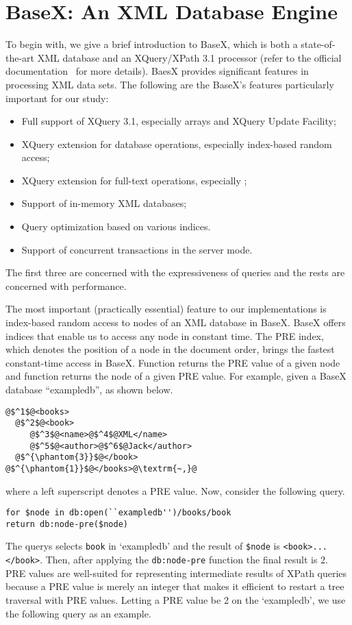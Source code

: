 \section{BaseX: An XML Database Engine}
\label{sect:basex}

To begin with, we give a brief introduction to BaseX, which is both a
state-of-the-art XML database and an XQuery/XPath 3.1 processor (refer to the
official documentation~\cite{basex864} for more details). BaesX provides
significant features in processing XML data sets. The following are the BaseX's
features particularly important for our study:

\begin{itemize}
	\item Full support of XQuery 3.1, especially arrays and XQuery Update Facility;
	\item XQuery extension for database operations, especially index-based
	random access;
	\item XQuery extension for full-text operations, especially
	;
	\item Support of in-memory XML databases;
	\item Query optimization based on various indices.
	\item Support of concurrent transactions in the server mode.
\end{itemize}

The first three are concerned with the expressiveness of queries and the rests
are concerned with performance.

The most important (practically essential) feature to our implementations is
index-based random access to nodes of an XML database in BaseX. BaseX offers
indices that enable us to access any node in constant time. The PRE index, which
denotes the position of a node in the document order, brings the fastest
constant-time access in BaseX. Function  returns the PRE value
of a given node and function  returns the node of a given PRE
value. For example, given a BaseX database ``exampledb'', as shown below.
\begin{lstlisting}[escapechar=\@]
@$^1$@<books>
  @$^2$@<book>
	 @$^3$@<name>@$^4$@XML</name>
	 @$^5$@<author>@$^6$@Jack</author>
  @$^{\phantom{3}}$@</book>
@$^{\phantom{1}}$@</books>@\textrm{~,}@
\end{lstlisting}
where a left superscript denotes a PRE value. Now, consider the following query.
\begin{lstlisting}
for $node in db:open(``exampledb'')/books/book
return db:node-pre($node)
\end{lstlisting}
The querys selects \texttt{book} in `exampledb' and the result of \texttt{\$node} is
\verb|<book>...</book>|. Then, after applying the \texttt{db:node-pre} function
the final result is 2. PRE values are well-suited for representing intermediate
results of XPath queries because a PRE value is merely an integer that makes it
efficient to restart a tree traversal with PRE values. Letting a PRE value be 2
on the `exampledb', we use the following query as an example.

